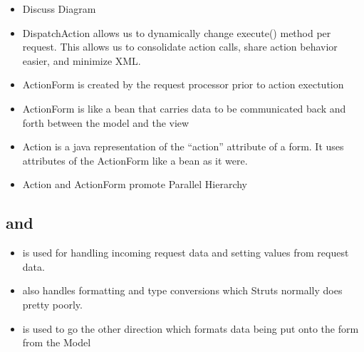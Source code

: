 \begin{ifhtml}
\begin{s5slide}
    \begin{slideshow}
      \item {}
    \end{slideshow}
    
    \begin{s5notes}
      \begin{itemize}
      \item Discuss Diagram
      \item DispatchAction allows us to dynamically change execute() method per request. This allows us to consolidate action calls, share action behavior easier, and minimize XML.
      \item ActionForm is created by the request processor prior to action exectution
      \item ActionForm is like a bean that carries data to be communicated back and forth between the model and the view
      \item Action is a java representation of the ``action'' attribute of a form. It uses attributes of the ActionForm like a bean as it were.
      \item Action and ActionForm promote Parallel Hierarchy
      \end{itemize}
    \end{s5notes}
  \end{s5slide}

  \begin{s5slide}
    \section{ and }
    \begin{itemize}
      \item {} is used for handling incoming request data and setting  values from request data.
      \item {} also handles formatting and type conversions which Struts normally does pretty poorly.
      \item {} is used to go the other direction which formats data being put onto the form from the Model
    \end{itemize}
    \begin{slideshow}
      \item {}
    \end{slideshow}
    

\end{s5slide}
\end{ifhtml}
